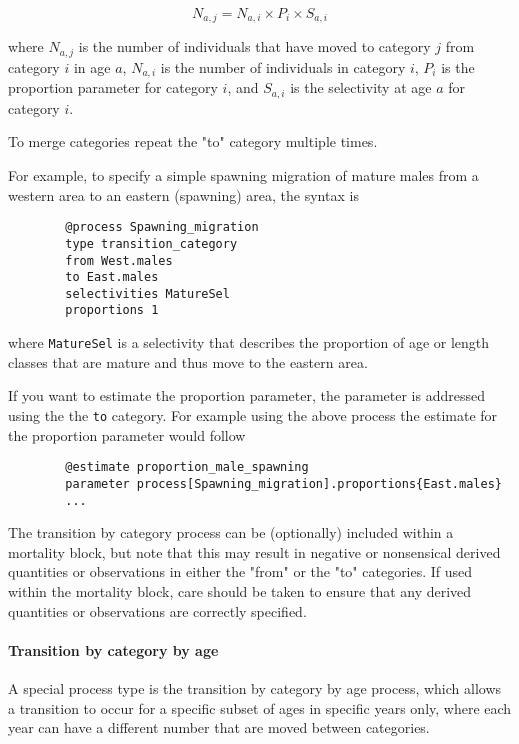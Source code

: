 \begin{equation}
	N_{a,j} = N_{a,i} \times P_i \times S_{a,i}
\end{equation}

where $N_{a,j}$ is the number of individuals that have moved to category $j$ from category $i$ in age $a$, $N_{a,i}$ is the number of individuals in category $i$, $P_i$ is the proportion parameter for category $i$, and $S_{a,i}$ is the selectivity at age $a$ for category $i$.

To merge categories repeat the "to" category multiple times.

For example, to specify a simple spawning migration of mature males from a western area to an eastern (spawning) area, the syntax is

{\small{\begin{verbatim}
		@process Spawning_migration
		type transition_category
		from West.males
		to East.males
		selectivities MatureSel
		proportions 1
		\end{verbatim}}}

where \texttt{MatureSel} is a selectivity that describes the proportion of age or length classes that are mature and thus move to the eastern area.

If you want to estimate the proportion parameter, the parameter is addressed using the the \texttt{to} category. For example using the above process the estimate for the proportion parameter would follow

{\small{\begin{verbatim}
		@estimate proportion_male_spawning
		parameter process[Spawning_migration].proportions{East.males}
		...
\end{verbatim}}}

The transition by category process can be (optionally) included within a mortality block, but note that this may result in negative or nonsensical derived quantities or observations in either the "from" or the "to" categories. If used within the mortality block, care should be taken to ensure that any derived quantities or observations are correctly specified.

\paragraph{Transition by category by age}\label{sec:Process-TransitionCategoryByAge}

A special process type is the transition by category by age process, which allows a transition to occur for a specific subset of ages in specific years only, where each year can have a different number that are moved between categories.

